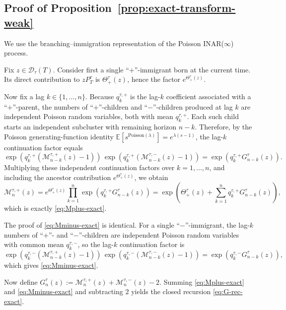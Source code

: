 \documentclass[letterpaper]{article}
\numberwithin{equation}{section}
\theoremstyle{definition}
\theoremstyle{remark}
\newcommand{\E}{\mathbb{E}}
\begin{document}





\subsection{Proof of Proposition~\ref{prop:exact-transform-weak}}\label{app:weak-euro-exact}
We use the branching--immigration representation of the Poisson INAR($\infty$) process.

Fix $z\in\mathcal D_\tau(T)$. Consider first a single ``$+$''-immigrant born at the current time. Its direct contribution to $zP_T^\tau$ is $\Theta_+^\tau(z)$, hence the factor $e^{\Theta_+^\tau(z)}$.

Now fix a lag $k\in\{1,\dots,n\}$. Because $q_k^{\tau,+}$ is the lag-$k$ coefficient associated with a ``$+$''-parent, the numbers of ``$+$''-children and ``$-$''-children produced at lag $k$ are independent Poisson random variables, both with mean $q_k^{\tau,+}$. Each such child starts an independent subcluster with remaining horizon $n-k$. Therefore, by the Poisson generating-function identity
$\E\left[s^{\mathrm{Poisson}(\lambda)}\right]=e^{\lambda(s-1)}$,
the lag-$k$ continuation factor equals
\[
  \exp\!\left(q_k^{\tau,+}(\mathcal M_{n-k}^{\tau,+}(z)-1)\right)\,
  \exp\!\left(q_k^{\tau,+}(\mathcal M_{n-k}^{\tau,-}(z)-1)\right)
  =
  \exp\!\left(q_k^{\tau,+}G_{n-k}^\tau(z)\right).
\]
Multiplying these independent continuation factors over $k=1,\dots,n$, and including the ancestor contribution $e^{\Theta_+^\tau(z)}$, we obtain
\[
  \mathcal M_n^{\tau,+}(z)
  =
  e^{\Theta_+^\tau(z)}
  \prod_{k=1}^n
  \exp\!\left(q_k^{\tau,+}G_{n-k}^\tau(z)\right)
  =
  \exp\!\left(
    \Theta_+^\tau(z)
    +\sum_{k=1}^n q_k^{\tau,+}G_{n-k}^\tau(z)
  \right),
\]
which is exactly \eqref{eq:Mplus-exact}.

The proof of \eqref{eq:Mminus-exact} is identical. For a single ``$-$''-immigrant, the lag-$k$ numbers of ``$+$''- and ``$-$''-children are independent Poisson random variables with common mean $q_k^{\tau,-}$, so the lag-$k$ continuation factor is
\[
  \exp\!\left(q_k^{\tau,-}(\mathcal M_{n-k}^{\tau,+}(z)-1)\right)\,
  \exp\!\left(q_k^{\tau,-}(\mathcal M_{n-k}^{\tau,-}(z)-1)\right)
  =
  \exp\!\left(q_k^{\tau,-}G_{n-k}^\tau(z)\right),
\]
which gives \eqref{eq:Mminus-exact}.

Now define $G_n^\tau(z):=\mathcal M_n^{\tau,+}(z)+\mathcal M_n^{\tau,-}(z)-2$. Summing \eqref{eq:Mplus-exact} and \eqref{eq:Mminus-exact} and subtracting $2$ yields the closed recursion \eqref{eq:G-rec-exact}.
\end{document}
